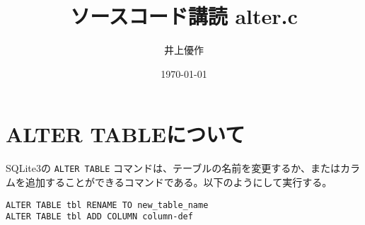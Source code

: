 \documentclass[11pt]{article}
\author{井上優作}
\date{\today}
\title{ソースコード講読 alter.c}
\begin{document}
\maketitle

\section*{ALTER TABLEについて}
\label{sec-1}

SQLite3の \verb~ALTER TABLE~ コマンドは、テーブルの名前を変更するか、またはカラムを追加することができるコマンドである。以下のようにして実行する。

\begin{verbatim}
ALTER TABLE tbl RENAME TO new_table_name
ALTER TABLE tbl ADD COLUMN column-def
\end{verbatim}
\end{document}
